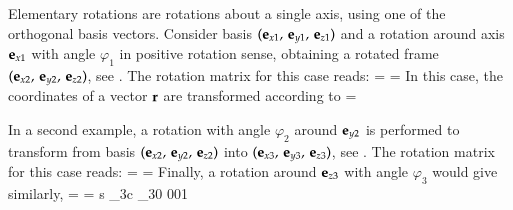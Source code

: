 Elementary rotations are rotations about a single axis, using one of the orthogonal basis vectors.
Consider basis $(\mathbf{e}_{x1},\,\mathbf{e}_{y1},\,\mathbf{e}_{z1})$ and a rotation around axis $\mathbf{e}_{x1}$ with angle $\varphi_1$ in positive rotation sense, obtaining a rotated frame $(\mathbf{e}_{x2},\,\mathbf{e}_{y2},\,\mathbf{e}_{z2})$, see .
The rotation matrix for this case reads:
\be
   =  = 
  \eqDot
\ee
%  
In this case, the coordinates of a vector $\mathbf{r}$ are transformed according to
\be
   =  
\ee

%
In a second example, a rotation with angle $\varphi_2$ around $\mathbf{e}_{y2}$ is performed to transform from basis $(\mathbf{e}_{x2},\,\mathbf{e}_{y2},\,\mathbf{e}_{z2})$ into $(\mathbf{e}_{x3},\,\mathbf{e}_{y3},\,\mathbf{e}_{z3})$, see .
The rotation matrix for this case reads:
\be
   =  = 
  \eqDot
\ee
%
%
Finally, a rotation around $\mathbf{e}_{z3}$ with angle $\varphi_3$ would give similarly,
\be
   =  = 
   {s \varphi_3}{c \varphi_3}{0} {0}{0}{1} \eqDot
\ee




